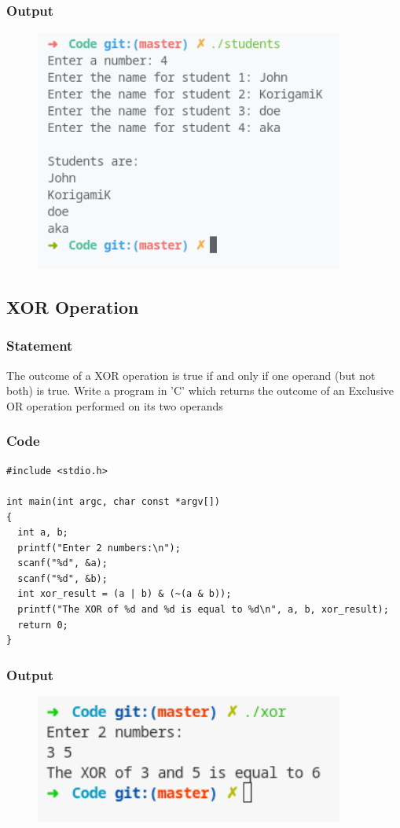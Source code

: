 \subsubsection{Output}
\begin{figure}[!htb]
  \centering
  \includegraphics[width=4in]{Images/student_names.png}
  \label{output:5}
\end{figure}

\pagebreak
\subsection{XOR Operation}

\subsubsection{Statement}
The outcome of a XOR operation is true if and only if one operand (but not both) is true. Write
a program in 'C' which returns the outcome of an Exclusive OR operation performed on its two
operands

\subsubsection{Code}
\begin{verbatim} 
#include <stdio.h>

int main(int argc, char const *argv[])
{
  int a, b;
  printf("Enter 2 numbers:\n");
  scanf("%d", &a);
  scanf("%d", &b);
  int xor_result = (a | b) & (~(a & b));
  printf("The XOR of %d and %d is equal to %d\n", a, b, xor_result);
  return 0;
}

\end{verbatim}
\subsubsection{Output}
\begin{figure}[!htb]
  \centering
  \includegraphics[width=4in]{Images/xor.png}
  \label{output:6}
\end{figure}


